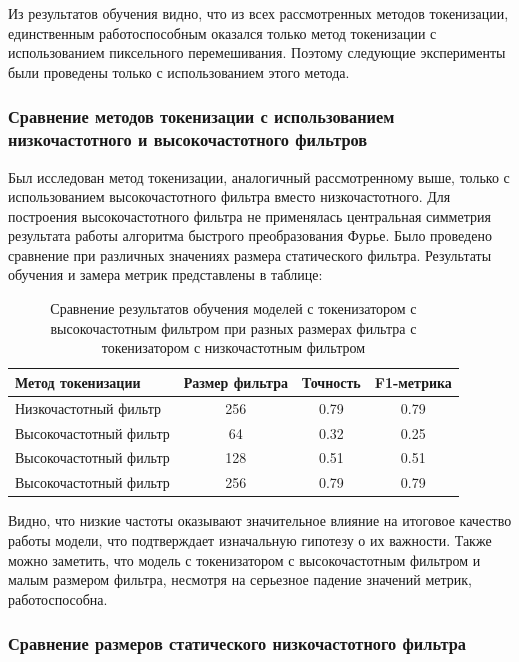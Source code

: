 \documentclass[times,specification,annotation]{itmo-student-thesis}
\begin{document}
Из результатов обучения видно, что из всех рассмотренных методов токенизации, единственным работоспособным оказался только метод токенизации с использованием пиксельного перемешивания. Поэтому следующие эксперименты были проведены только с использованием этого метода.

\subsubsection{Сравнение методов токенизации с использованием низкочастотного и высокочастотного фильтров}

Был исследован метод токенизации, аналогичный рассмотренному выше, только с использованием высокочастотного фильтра вместо низкочастотного. Для построения высокочастотного фильтра не применялась центральная симметрия результата работы алгоритма быстрого преобразования Фурье. Было проведено сравнение при различных значениях размера статического фильтра. Результаты обучения и замера метрик представлены в таблице: 

\begin{table}[H]
  \centering
  \caption{Сравнение результатов обучения моделей с токенизатором с высокочастотным фильтром при разных размерах фильтра с токенизатором с низкочастотным фильтром}
  \label{tab:fft-tokenization-unshifted}
  \begin{tabular}{|l|c|c|c|}
    \hline
    Метод токенизации & Размер фильтра & Точность & F1-метрика \\ \hline
    Низкочастотный фильтр & 256 & 0.79 & 0.79 \\
    Высокочастотный фильтр & 64 & 0.32 & 0.25 \\
    Высокочастотный фильтр & 128 & 0.51 & 0.51 \\
    Высокочастотный фильтр & 256 & 0.79 & 0.79 \\
    \hline
  \end{tabular}
\end{table}

Видно, что низкие частоты оказывают значительное влияние на итоговое качество работы модели, что подтверждает изначальную гипотезу о их важности. Также можно заметить, что модель с токенизатором с высокочастотным фильтром и малым размером фильтра, несмотря на серьезное падение значений метрик, работоспособна.

\subsubsection{Сравнение размеров статического низкочастотного фильтра}
\end{document}
